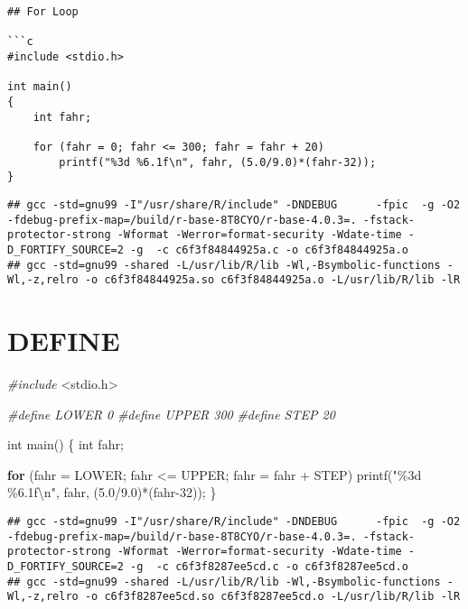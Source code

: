 \documentclass[
]{book}
\newenvironment{Shaded}{\begin{snugshade}}{\end{snugshade}}
\newcommand{\ControlFlowTok}[1]{\textcolor[rgb]{0.13,0.29,0.53}{\textbf{#1}}}
\newcommand{\DataTypeTok}[1]{\textcolor[rgb]{0.13,0.29,0.53}{#1}}
\newcommand{\DecValTok}[1]{\textcolor[rgb]{0.00,0.00,0.81}{#1}}
\newcommand{\FloatTok}[1]{\textcolor[rgb]{0.00,0.00,0.81}{#1}}
\newcommand{\ImportTok}[1]{#1}
\newcommand{\NormalTok}[1]{#1}
\newcommand{\PreprocessorTok}[1]{\textcolor[rgb]{0.56,0.35,0.01}{\textit{#1}}}
\newcommand{\SpecialCharTok}[1]{\textcolor[rgb]{0.00,0.00,0.00}{#1}}
\newcommand{\StringTok}[1]{\textcolor[rgb]{0.31,0.60,0.02}{#1}}
\begin{document}
\begin{verbatim}
## For Loop

```c
#include <stdio.h>

int main()
{
    int fahr;

    for (fahr = 0; fahr <= 300; fahr = fahr + 20)
        printf("%3d %6.1f\n", fahr, (5.0/9.0)*(fahr-32));
}
\end{verbatim}

\begin{verbatim}
## gcc -std=gnu99 -I"/usr/share/R/include" -DNDEBUG      -fpic  -g -O2 -fdebug-prefix-map=/build/r-base-8T8CYO/r-base-4.0.3=. -fstack-protector-strong -Wformat -Werror=format-security -Wdate-time -D_FORTIFY_SOURCE=2 -g  -c c6f3f84844925a.c -o c6f3f84844925a.o
## gcc -std=gnu99 -shared -L/usr/lib/R/lib -Wl,-Bsymbolic-functions -Wl,-z,relro -o c6f3f84844925a.so c6f3f84844925a.o -L/usr/lib/R/lib -lR
\end{verbatim}

\hypertarget{define}{%
\section{DEFINE}\label{define}}

\begin{Shaded}
\begin{Highlighting}[]
\PreprocessorTok{\#include }\ImportTok{\textless{}stdio.h\textgreater{}}

\PreprocessorTok{\#define LOWER 0}
\PreprocessorTok{\#define UPPER 300}
\PreprocessorTok{\#define STEP 20}

\DataTypeTok{int}\NormalTok{ main()}
\NormalTok{\{}
    \DataTypeTok{int}\NormalTok{ fahr;}

    \ControlFlowTok{for}\NormalTok{ (fahr = LOWER; fahr \textless{}= UPPER; fahr = fahr + STEP)}
\NormalTok{        printf(}\StringTok{"\%3d \%6.1f}\SpecialCharTok{\textbackslash{}n}\StringTok{"}\NormalTok{, fahr, (}\FloatTok{5.0}\NormalTok{/}\FloatTok{9.0}\NormalTok{)*(fahr{-}}\DecValTok{32}\NormalTok{));}
\NormalTok{\}}
\end{Highlighting}
\end{Shaded}

\begin{verbatim}
## gcc -std=gnu99 -I"/usr/share/R/include" -DNDEBUG      -fpic  -g -O2 -fdebug-prefix-map=/build/r-base-8T8CYO/r-base-4.0.3=. -fstack-protector-strong -Wformat -Werror=format-security -Wdate-time -D_FORTIFY_SOURCE=2 -g  -c c6f3f8287ee5cd.c -o c6f3f8287ee5cd.o
## gcc -std=gnu99 -shared -L/usr/lib/R/lib -Wl,-Bsymbolic-functions -Wl,-z,relro -o c6f3f8287ee5cd.so c6f3f8287ee5cd.o -L/usr/lib/R/lib -lR
\end{verbatim}
\end{document}
